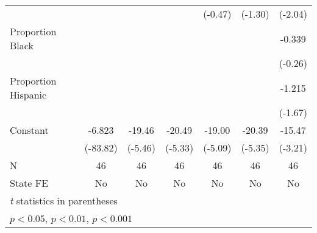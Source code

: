 {\begin{tabular}{l*{6}{c}}
                    &                     &                     &                     &     (-0.47)         &     (-1.30)         &     (-2.04)         \\
\addlinespace
Proportion Black    &                     &                     &                     &                     &                     &      -0.339         \\
                    &                     &                     &                     &                     &                     &     (-0.26)         \\
\addlinespace
Proportion Hispanic &                     &                     &                     &                     &                     &      -1.215         \\
                    &                     &                     &                     &                     &                     &     (-1.67)         \\
\addlinespace
Constant            &      -6.823\sym{***}&      -19.46\sym{***}&      -20.49\sym{***}&      -19.00\sym{***}&      -20.39\sym{***}&      -15.47\sym{**} \\
                    &    (-83.82)         &     (-5.46)         &     (-5.33)         &     (-5.09)         &     (-5.35)         &     (-3.21)         \\
\midrule
N                   &          46         &          46         &          46         &          46         &          46         &          46         \\
State FE            &          No         &          No         &          No         &          No         &          No         &          No         \\
\bottomrule
\multicolumn{7}{l}{\footnotesize \textit{t} statistics in parentheses}\\
\multicolumn{7}{l}{\footnotesize \sym{*} \(p<0.05\), \sym{**} \(p<0.01\), \sym{***} \(p<0.001\)}\\
\end{tabular}
}
